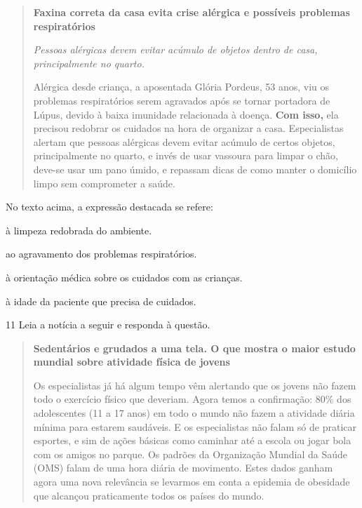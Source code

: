 \begin{quote}

\textbf{Faxina correta da casa evita crise alérgica e possíveis problemas
respiratórios}

\textit{Pessoas alérgicas devem evitar acúmulo de objetos dentro de casa,
principalmente no quarto.}

Alérgica desde criança, a aposentada Glória Pordeus, 53 anos, viu os
problemas respiratórios serem agravados após se tornar portadora de
Lúpus, devido à baixa imunidade relacionada à doença. \textbf{Com isso,}
ela precisou redobrar os cuidados na hora de organizar a casa.
Especialistas alertam que pessoas alérgicas devem evitar acúmulo de
certos objetos, principalmente no quarto, e invés de usar vassoura para
limpar o chão, deve-se usar um pano úmido, e repassam dicas de como
manter o domicílio limpo sem comprometer a saúde.


\end{quote}

No texto acima, a expressão destacada se refere:

\begin{escolha}
  
  \item à limpeza redobrada do ambiente.
  
  \item ao agravamento dos problemas respiratórios.
  
  \item à orientação médica sobre os cuidados com as crianças.
  
  \item à idade da paciente que precisa de cuidados.

\end{escolha}

\num{11} Leia a notícia a seguir e responda à questão.

\begin{quote}

\textbf{Sedentários e grudados a uma tela. O
que mostra o maior estudo mundial sobre atividade física de
jovens}

Os especialistas já há algum tempo vêm alertando que os jovens não fazem todo o exercício físico que deveriam. Agora temos a confirmação: 80\% dos adolescentes (11 a 17 anos) em todo o mundo não fazem a atividade diária mínima para estarem saudáveis. E os especialistas não falam só de praticar esportes, e sim de ações básicas como caminhar até a escola ou jogar bola com os amigos no parque. Os padrões da Organização Mundial da Saúde (OMS) falam de uma hora diária de movimento. Estes dados ganham agora uma nova relevância se levarmos em conta a epidemia de obesidade que alcançou praticamente todos os países do mundo.

\end{quote}

